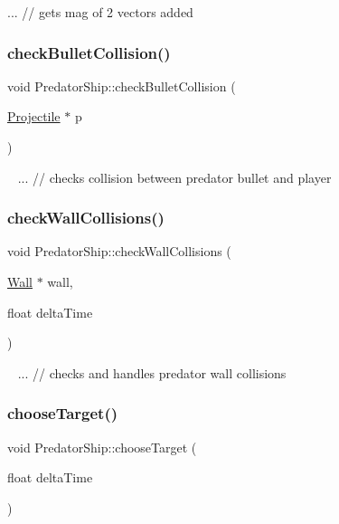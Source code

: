 ... // gets mag of 2 vectors added\mbox{\label{class_predator_ship_a5b3c56caa2c17fbe78d377c0b4ad5408}} 
\subsubsection{\texorpdfstring{check\+Bullet\+Collision()}{checkBulletCollision()}}
{\footnotesize\ttfamily void Predator\+Ship\+::check\+Bullet\+Collision (\begin{DoxyParamCaption}\item[{\mbox{\hyperlink{class_projectile}{Projectile}} $\ast$}]{p }\end{DoxyParamCaption})}

~\newline
... // checks collision between predator bullet and player\mbox{\label{class_predator_ship_aa7763a0a0b525421f672ef3e05c1b9ea}} 
\subsubsection{\texorpdfstring{check\+Wall\+Collisions()}{checkWallCollisions()}}
{\footnotesize\ttfamily void Predator\+Ship\+::check\+Wall\+Collisions (\begin{DoxyParamCaption}\item[{\mbox{\hyperlink{class_wall}{Wall}} $\ast$}]{wall,  }\item[{float}]{delta\+Time }\end{DoxyParamCaption})}

~\newline
... // checks and handles predator wall collisions\mbox{\label{class_predator_ship_a5143808a096196286fa4b3c546c183ce}} 
\subsubsection{\texorpdfstring{choose\+Target()}{chooseTarget()}}
{\footnotesize\ttfamily void Predator\+Ship\+::choose\+Target (\begin{DoxyParamCaption}\item[{float}]{delta\+Time }\end{DoxyParamCaption})}

